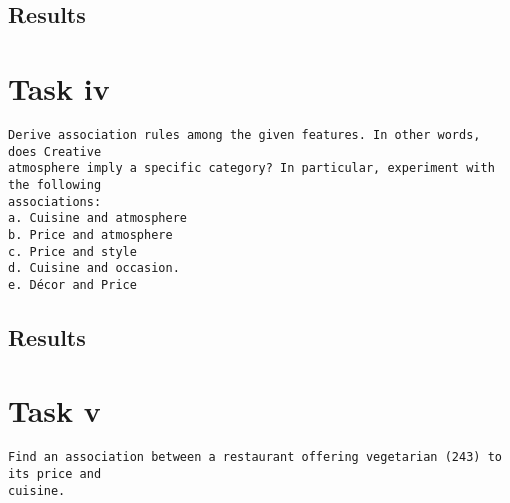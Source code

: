 \documentclass[letterpaper,10pt]{article}
\begin{document}
\subsection*{Results}

\clearpage
\newpage
{}
\section*{Task iv}
\begin{verbatim}
Derive association rules among the given features. In other words, does Creative
atmosphere imply a specific category? In particular, experiment with the following
associations:
a. Cuisine and atmosphere
b. Price and atmosphere
c. Price and style
d. Cuisine and occasion.
e. Décor and Price
\end{verbatim}
\subsection*{Results}
\clearpage
\newpage
{}
\section*{Task v}
\begin{verbatim}
Find an association between a restaurant offering vegetarian (243) to its price and
cuisine.
\end{verbatim}
\end{document}
